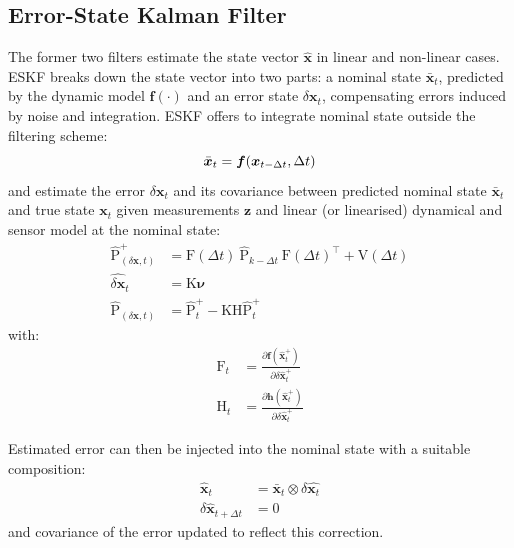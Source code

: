 \subsection{Error-State Kalman Filter}
The former two filters estimate the state vector $\hat{\boldsymbol{x}}$ in linear and non-linear cases. \gls{ESKF} breaks down the state vector into two parts: a nominal state $\bar{\boldsymbol{x}}_t$, predicted by the dynamic model $\boldsymbol{f}(\cdot)$ and an error state $\delta\boldsymbol{x}_t$, compensating errors induced by noise and integration. \gls{ESKF} offers to integrate nominal state outside the filtering scheme:
\begin{equation}
    \bar{\boldsymbol{x}}_t = \boldsymbol{f}( \boldsymbol{x}_{t-\Delta t}, \Delta t) \label{eq:eskf_update_nominal} \\
\end{equation}
and estimate the error $\delta\boldsymbol{x}_t$ and its covariance between predicted nominal state $\bar{\boldsymbol{x}}_t$ and true state $\boldsymbol{x}_t$ given measurements $\boldsymbol{z}$ and linear (or linearised) dynamical and sensor model at the nominal state:
\begin{align}
    \hat{\text{P}}^{+}_{(\delta \boldsymbol{x}, t)} &= \text{F}(\Delta t) \: \hat{\text{P}}_{k-\Delta t} \: \text{F}(\Delta t)^\intercal + \hat{\text{V}}(\Delta t) \\
    \hat{\delta \boldsymbol{x}}_t &= \text{K}\boldsymbol{\nu} \\
    \hat{\text{P}}_{(\delta \boldsymbol{x}, t)} &= \hat{\text{P}}^{+}_t - \text{K}\text{H}\hat{\text{P}}^{+}_t
\end{align}
with:
\begin{align}
\text{F}_t &= \frac{ \partial\boldsymbol{f}(\hat{\boldsymbol{x}}^{+}_t) }{ \partial\delta\hat{\boldsymbol{x}}^{+}_t } \\
\text{H}_t &= \frac{ \partial\boldsymbol{h}(\hat{\boldsymbol{x}}^{+}_t) }{ \partial\delta\hat{\boldsymbol{x}}^{+}_t }
\end{align}

Estimated error can then be injected into the nominal state with a suitable composition:
\begin{align}
\hat{\boldsymbol{x}}_t &= \bar{\boldsymbol{x}}_t \otimes \delta\hat{\boldsymbol{x}_t} \label{eq:eskf_correct_state} \\
\delta\hat{\boldsymbol{x}}_{t+\Delta t} &= 0
\end{align}
and covariance of the error updated to reflect this correction.


